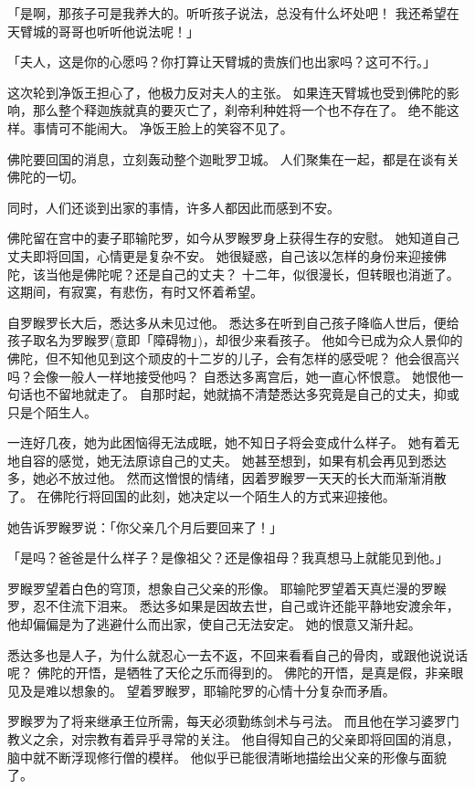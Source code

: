 \documentclass[twoside,openany]{book}
\begin{document}
「是啊，那孩子可是我养大的。听听孩子说法，总没有什么坏处吧！
我还希望在天臂城的哥哥也听听他说法呢！」

「夫人，这是你的心愿吗？你打算让天臂城的贵族们也出家吗？这可不行。」

这次轮到净饭王担心了，他极力反对夫人的主张。
如果连天臂城也受到佛陀的影响，那么整个释迦族就真的要灭亡了，刹帝利种姓将一个也不存在了。
绝不能这样。事情可不能闹大。
净饭王脸上的笑容不见了。

佛陀要回国的消息，立刻轰动整个迦毗罗卫城。
人们聚集在一起，都是在谈有关佛陀的一切。

同时，人们还谈到出家的事情，许多人都因此而感到不安。

佛陀留在宫中的妻子耶输陀罗，如今从罗睺罗身上获得生存的安慰。
她知道自己丈夫即将回国，心情更是复杂不安。
她很疑惑，自己该以怎样的身份来迎接佛陀，该当他是佛陀呢？还是自己的丈夫？
十二年，似很漫长，但转眼也消逝了。
这期间，有寂寞，有悲伤，有时又怀着希望。

自罗睺罗长大后，悉达多从未见过他。
悉达多在听到自己孩子降临人世后，便给孩子取名为罗睺罗(意即「障碍物」)，却很少来看孩子。
他如今已成为众人景仰的佛陀，但不知他见到这个顽皮的十二岁的儿子，会有怎样的感受呢？
他会很高兴吗？会像一般人一样地接受他吗？
自悉达多离宫后，她一直心怀恨意。
她恨他一句话也不留地就走了。
自那时起，她就搞不清楚悉达多究竟是自己的丈夫，抑或只是个陌生人。

一连好几夜，她为此困恼得无法成眠，她不知日子将会变成什么样子。
她有着无地自容的感觉，她无法原谅自己的丈夫。
她甚至想到，如果有机会再见到悉达多，她必不放过他。
然而这憎恨的情绪，因着罗睺罗一天天的长大而渐渐消散了。
在佛陀行将回国的此刻，她决定以一个陌生人的方式来迎接他。

她告诉罗睺罗说：「你父亲几个月后要回来了！」

「是吗？爸爸是什么样子？是像祖父？还是像祖母？我真想马上就能见到他。」

罗睺罗望着白色的穹顶，想象自己父亲的形像。
耶输陀罗望着天真烂漫的罗睺罗，忍不住流下泪来。
悉达多如果是因故去世，自己或许还能平静地安渡余年，他却偏偏是为了逃避什么而出家，使自己无法安定。
她的恨意又渐升起。

悉达多也是人子，为什么就忍心一去不返，不回来看看自己的骨肉，或跟他说说话呢？
佛陀的开悟，是牺牲了天伦之乐而得到的。
佛陀的开悟，是真是假，非亲眼见及是难以想象的。
望着罗睺罗，耶输陀罗的心情十分复杂而矛盾。

罗睺罗为了将来继承王位所需，每天必须勤练剑术与弓法。
而且他在学习婆罗门教义之余，对宗教有着异乎寻常的关注。
他自得知自己的父亲即将回国的消息，脑中就不断浮现修行僧的模样。
他似乎已能很清晰地描绘出父亲的形像与面貌了。
\end{document}

